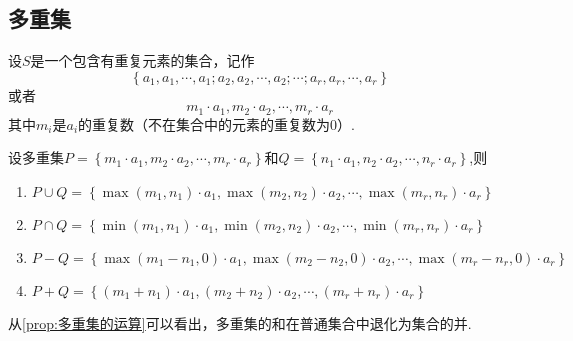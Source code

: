 \subsection{多重集}
\begin{formal}
    \begin{definition}[多重集的定义]\label{def:多重集的定义}
        设$S$是一个包含有重复元素的集合，记作\[
        \left\{
            a_1,a_1,\cdots,a_1;a_2,a_2,\cdots,a_2;\cdots;a_r,a_r,\cdots,a_r
        \right\}
        \]或者\[
        m_1\cdot a_1,m_2\cdot a_2,\cdots,m_r\cdot a_r
        \]其中$m_i$是$a_i$的重复数（不在集合中的元素的重复数为$0$）.
    \end{definition}
\end{formal}
\begin{formal}
    \begin{proposition}[多重集的运算]\label{prop:多重集的运算}
        设多重集$P=\left\{
            m_1\cdot a_1,m_2\cdot a_2,\cdots,m_r\cdot a_r
        \right\}$和$Q=\left\{
            n_1\cdot a_1,n_2\cdot a_2,\cdots,n_r\cdot a_r
        \right\}$,则\begin{enumerate}[label={\textup{(\arabic*)}}]
            \item $
            P\cup Q=\left\{
                \max\left(
                    m_1,n_1
                \right)\cdot a_1,\max\left(
                    m_2,n_2
                \right)\cdot a_2,\cdots,\max\left(
                    m_r,n_r
                \right)\cdot a_r
            \right\}
            $
            \item $
            P\cap Q=\left\{
                \min\left(
                    m_1,n_1
                \right)\cdot a_1,\min\left(
                    m_2,n_2
                \right)\cdot a_2,\cdots,\min\left(
                    m_r,n_r
                \right)\cdot a_r
            \right\}
            $
            \item $ 
            P-Q=\left\{
                \max\left(
                    m_1-n_1,0
                \right)\cdot a_1,\max\left(
                    m_2-n_2,0
                \right)\cdot a_2,\cdots,\max\left(
                    m_r-n_r,0
                \right)\cdot a_r
            \right\}
            $
            \item $
            P+Q=\left\{
                \left(
                    m_1+n_1
                \right)\cdot a_1,\left(
                    m_2+n_2
                \right)\cdot a_2,\cdots,\left(
                    m_r+n_r
                \right)\cdot a_r
            \right\}
            $
        \end{enumerate}
    \end{proposition}
\end{formal}
\begin{red}
\begin{remark}
    从\cref{prop:多重集的运算}可以看出，多重集的和在普通集合中退化为集合的并.
\end{remark}
\end{red}